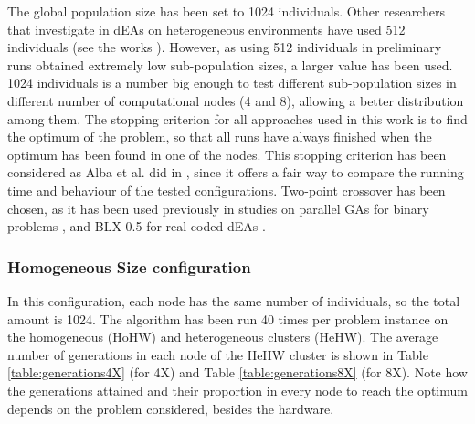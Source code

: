 \documentclass[final,1p,times]{elsarticle}
\begin{document}
The global population size has been set to 1024 individuals. Other researchers that investigate in dEAs on heterogeneous environments have used 512 individuals (see the works \cite{HYDROCM,Dominguez13HydroCM,Salto13Distributed}). However, as using 512 individuals in  preliminary runs obtained extremely low sub-population sizes, a larger value has been used. 1024 individuals is a number big enough to test different sub-population sizes in different number of computational nodes (4 and 8), allowing a better distribution among them. The stopping criterion for all approaches used in this work is to find the optimum of the problem, so that all runs have always finished when the optimum has been found in one of the nodes. This stopping criterion has been considered as Alba et al. did in \cite{EVALUATIONPARALLEL}, since it offers a fair way to compare the running time and behaviour of the tested configurations. Two-point crossover has been chosen, as it has been used previously in studies on parallel GAs  for binary problems \cite{CantuPazTopologies99}, and BLX-0.5 for real coded dEAs \cite{Robles09ParallelFuzzy}.

\subsubsection{Homogeneous Size configuration}



In this configuration, each node has the same number of individuals, so the total amount is 1024.  The algorithm has been run 40 times per problem instance on the homogeneous (HoHW) and heterogeneous clusters (HeHW).  The average number of generations in each node of the HeHW cluster is shown in Table \ref{table:generations4X} (for 4X) and Table \ref{table:generations8X} (for 8X). Note how the generations attained and their proportion in every node to reach the optimum depends on the problem considered, besides the hardware.
\end{document}
